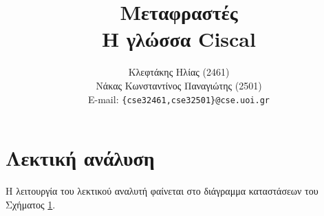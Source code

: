 \documentclass[a4paper]{article}
\title{Μεταφραστές \\ Η γλώσσα Ciscal}
\author{Κλεφτάκης Ηλίας (2461)\\
Νάκας Κωνσταντίνος Παναγιώτης (2501)\\
E-mail: \texttt{\{cse32461,cse32501\}@cse.uoi.gr}}
\begin{document}
\maketitle

\section{Λεκτική ανάλυση}
Η λειτουργία του λεκτικού αναλυτή φαίνεται στο διάγραμμα καταστάσεων του
Σχήματος \ref{figure:lexical}.
\begin{figure}[!htpb]
    \caption{}
    \label{figure:lexical}
\end{figure}
\end{document}
